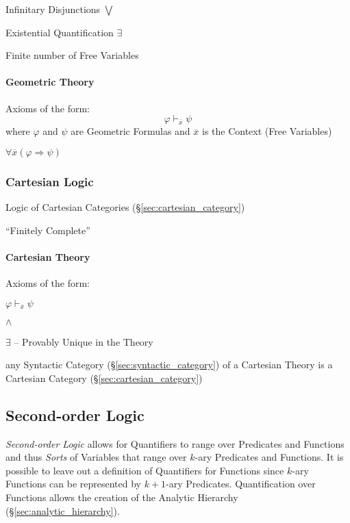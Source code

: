 Infinitary Disjunctions $\bigvee$

Existential Quantification $\exists$

Finite number of Free Variables



\paragraph{Geometric Theory}\label{sec:geometric_theory}\hfill

Axioms of the form:
\[
  \varphi \vdash_{\overline{x}} \psi
\]
where $\varphi$ and $\psi$ are Geometric Formulas and $\overline{x}$
is the Context (Free Variables) %

$\forall \overline{x} (\varphi \Rightarrow \psi)$



\subsubsection{Cartesian Logic}\label{sec:cartesian_logic}

Logic of Cartesian Categories (\S\ref{sec:cartesian_category})

``Finitely Complete''



\paragraph{Cartesian Theory}\label{sec:cartesian_theory}\hfill

Axioms of the form:

$\varphi \vdash_{\overline{x}} \psi$

$\wedge$

$\exists$ -- Provably Unique in the Theory

any Syntactic Category (\S\ref{sec:syntactic_category}) of a Cartesian
Theory is a Cartesian Category (\S\ref{sec:cartesian_category})



\subsection{Second-order Logic}\label{sec:secondorder_logic}

\emph{Second-order Logic} allows for Quantifiers to range over
Predicates and Functions and thus \emph{Sorts} of Variables that range
over $k$-ary Predicates and Functions. It is possible to leave out a
definition of Quantifiers for Functions since $k$-ary Functions can be
represented by $k+1$-ary Predicates.\cite{shapiro00} Quantification
over Functions allows the creation of the Analytic Hierarchy
(\S\ref{sec:analytic_hierarchy}).

